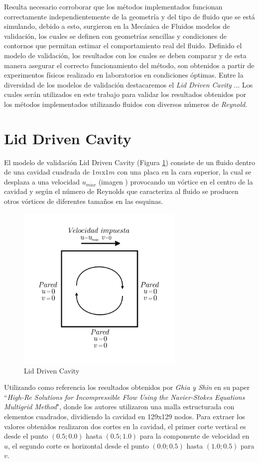 \documentclass[a4paper,10pt, oneside]{book}
\begin{document}
Resulta necesario corroborar que los métodos implementados funcionan correctamente independientemente de la geometría y del tipo de fluido que se está simulando, debido a esto, surgieron en la Mecánica de Fluidos modelos de validación, los cuales se definen con geometrías sencillas y condiciones de contornos que permitan estimar el comportamiento real del fluido. Definido el modelo de validación, los resultados con los cuales se deben comparar y de esta manera asegurar el correcto funcionamiento del método, son obtenidos a partir de experimentos físicos realizado en laboratorios en condiciones óptimas. Entre la diversidad de los modelos de validación destacaremos el \textit{Lid Driven Cavity} ... Los cuales serán utilizados en este trabajo para validar los resultados obtenidos por los métodos implementados utilizando fluidos con diversos números de \textit{Reynold}.

\section{Lid Driven Cavity}

El modelo de validación Lid Driven Cavity (Figura \ref{img:9-1}) consiste de un fluido dentro de una cavidad cuadrada de $1m$x$1m$ con una placa en la cara superior, la cual se desplaza a una velocidad $u_{m \acute{a} x}$ (imagen ) provocando un vórtice en el centro de la cavidad y según el número de Reynolds que caracteriza al fluido se producen otros vórtices de diferentes tamaños en las esquinas.
\begin{figure}[h!]
	\centering
	\includegraphics[width=8cm]{Img/9-1}
	\caption{Lid Driven Cavity}
	\label{img:9-1}
\end{figure}

Utilizando como referencia los resultados obtenidos por \textit{Ghia y Shin} en su paper ``\textit{High-Re Solutions for Incompressible Flow Using the Navier-Stokes Equations Multigrid Method}", donde los autores utilizaron una malla estructurada con elementos cuadrados, dividiendo la cavidad en 129x129 nodos. Para extraer los valores obtenidos realizaron dos cortes en la cavidad, el primer corte vertical  es  desde el punto $(0.5;0.0)$ hasta $(0.5;1.0)$ para la componente de velocidad en $u$, el segundo corte es horizontal desde el punto $(0.0;0.5)$ hasta $(1.0;0.5)$ para $v$.
\end{document}
